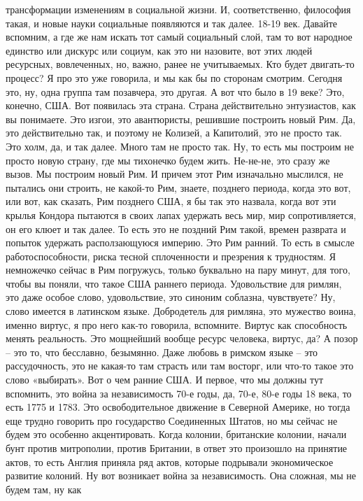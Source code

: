 трансформации изменениям в социальной жизни. И, соответственно, философия такая,
и новые науки социальные появляются и так далее. 18-19 век. Давайте вспомним, а
где же нам искать тот самый социальный слой, там то вот народное единство или
дискурс или социум, как это ни назовите, вот этих людей ресурсных, вовлеченных,
но, важно, ранее не учитываемых. Кто будет двигать-то процесс? Я про это уже
говорила, и мы как бы по сторонам смотрим. Сегодня это, ну, одна группа там
позавчера, это другая. А вот что было в 19 веке? Это, конечно, США. Вот
появилась эта страна. Страна действительно энтузиастов, как вы понимаете. Это
изгои, это авантюристы, решившие построить новый Рим. Да, это действительно так,
и поэтому не Колизей, а Капитолий, это не просто так. Это холм, да, и так далее.
Много там не просто так. Ну, то есть мы построим не просто новую страну, где мы
тихонечко будем жить. Не-не-не, это сразу же вызов. Мы построим новый Рим. И
причем этот Рим изначально мыслился, не пытались они строить, не какой-то Рим,
знаете, позднего периода, когда это вот, или вот, как сказать, Рим позднего США,
я бы так это назвала, когда вот эти крылья Кондора пытаются в своих лапах
удержать весь мир, мир сопротивляется, он его клюет и так далее. То есть это не
поздний Рим такой, времен разврата и попыток удержать расползающуюся империю.
Это Рим ранний. То есть в смысле работоспособности, риска тесной сплоченности и
презрения к трудностям. Я немножечко сейчас в Рим погружусь, только буквально на
пару минут, для того, чтобы вы поняли, что такое США раннего периода.
Удовольствие для римлян, это даже особое слово, удовольствие, это синоним
соблазна, чувствуете? Ну, слово имеется в латинском языке. Добродетель для
римляна, это мужество воина, именно виртус, я про него как-то говорила,
вспомните. Виртус как способность менять реальность. Это мощнейший вообще ресурс
человека, виртус, да? А позор – это то, что бесславно, безымянно. Даже любовь в
римском языке – это рассудочность, это не какая-то там страсть или там восторг,
или что-то такое это слово «выбирать». Вот о чем ранние США. И первое, что мы
должны тут вспомнить, это война за независимость 70-е годы, да, 70-е, 80-е годы
18 века, то есть 1775 и 1783. Это освободительное движение в Северной Америке,
но тогда еще трудно говорить про государство Соединенных Штатов, но мы сейчас не
будем это особенно акцентировать. Когда колонии, британские колонии, начали бунт
против митрополии, против Британии, в ответ это произошло на принятие актов, то
есть Англия приняла ряд актов, которые подрывали экономическое развитие колоний.
Ну вот возникает война за независимость. Она сложная, мы не будем там, ну как
